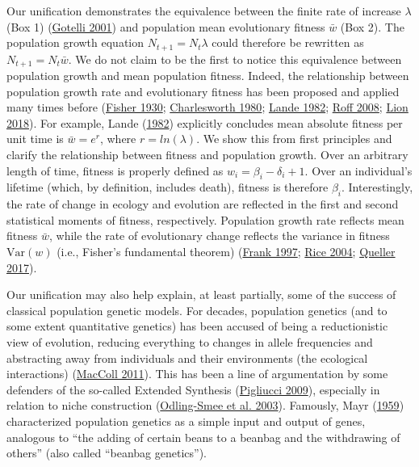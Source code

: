 \documentclass[
]{article}
\begin{document}
Our unification demonstrates the equivalence between the finite rate of
increase \(\lambda\) (Box 1)
(\protect\hyperlink{ref-Gotelli2001}{Gotelli 2001}) and population mean
evolutionary fitness \(\bar{w}\) (Box 2). The population growth equation
\(N_{t+1} = N_{t}\lambda\) could therefore be rewritten as
\(N_{t+1} = N_{t}\bar{w}\). We do not claim to be the first to notice
this equivalence between population growth and mean population fitness.
Indeed, the relationship between population growth rate and evolutionary
fitness has been proposed and applied many times before
(\protect\hyperlink{ref-Fisher1930}{Fisher 1930};
\protect\hyperlink{ref-Charlesworth1980}{Charlesworth 1980};
\protect\hyperlink{ref-Lande1982}{Lande 1982};
\protect\hyperlink{ref-Roff2008}{Roff 2008};
\protect\hyperlink{ref-Lion2018}{Lion 2018}). For example, Lande
(\protect\hyperlink{ref-Lande1982}{1982}) explicitly concludes mean
absolute fitness per unit time is \(\bar{w} = e^{r}\), where
\(r = ln(\lambda)\). We show this from first principles and clarify the
relationship between fitness and population growth. Over an arbitrary
length of time, fitness is properly defined as
\(w_{i} = \beta_{i} - \delta_{i} + 1\). Over an individual's lifetime
(which, by definition, includes death), fitness is therefore
\(\beta_{i}\). Interestingly, the rate of change in ecology and
evolution are reflected in the first and second statistical moments of
fitness, respectively. Population growth rate reflects mean fitness
\(\bar{w}\), while the rate of evolutionary change reflects the variance
in fitness \(\mathrm{Var}(w)\) (i.e., Fisher's fundamental theorem)
(\protect\hyperlink{ref-Frank1997}{Frank 1997};
\protect\hyperlink{ref-Rice2004}{Rice 2004};
\protect\hyperlink{ref-Queller2017}{Queller 2017}).

Our unification may also help explain, at least partially, some of the
success of classical population genetic models. For decades, population
genetics (and to some extent quantitative genetics) has been accused of
being a reductionistic view of evolution, reducing everything to changes
in allele frequencies and abstracting away from individuals and their
environments (the ecological interactions)
(\protect\hyperlink{ref-MacColl2011}{MacColl 2011}). This has been a
line of argumentation by some defenders of the so-called Extended
Synthesis (\protect\hyperlink{ref-Pigliucci2009}{Pigliucci 2009}),
especially in relation to niche construction
(\protect\hyperlink{ref-Odling-smee2003}{Odling-Smee et al. 2003}).
Famously, Mayr (\protect\hyperlink{ref-Mayr1960}{1959}) characterized
population genetics as a simple input and output of genes, analogous to
``the adding of certain beans to a beanbag and the withdrawing of
others'' (also called ``beanbag genetics'').
\end{document}
